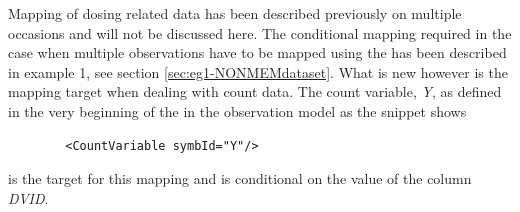 Mapping of dosing related data has been described previously on
multiple occasions and will not be discussed here. The conditional mapping required 
in the case when multiple observations have to be mapped using the 
has been described in example 1, see section \ref{sec:eg1-NONMEMdataset}. 
What is new however is the mapping target when dealing with count data.
The count variable, \emph{Y}, as defined in the very beginning of the  
in the observation model  as the snippet shows
\lstset{language=XML}
\begin{lstlisting}
		<CountVariable symbId="Y"/>
\end{lstlisting}
is the target for this mapping and is conditional on the value of the column \emph{DVID}.










